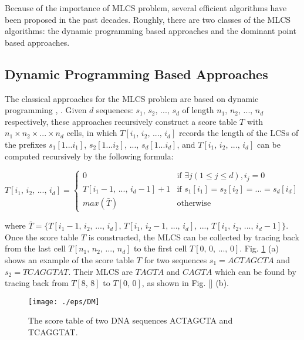 \documentclass{article}
\begin{document}
Because of the importance of MLCS problem, several efficient
algorithms have been proposed in the past decades. Roughly, there are
two classes of the MLCS algorithms: the dynamic programming based
approaches and the dominant point based approaches.

\subsection{Dynamic Programming Based Approaches}
\label{sec:Dynamic Programming}

The classical approaches for the MLCS problem are based on dynamic
programming \cite{Smith1981}, \cite{Sankoff1972}. Given $d$ sequences:
$s_1,\, s_2,\,...,\, s_d$ of length $n_1,\, n_2,\, ...,\, n_d$
respectively, these approaches recursively construct a score table $T$
with $n_1 \times n_2 \times ... \times n_d$ cells, in which
$T[i_1,\, i_2,\, ...,\, i_d]$ records the length of the LCSs of the
prefixes $s_1[1...i_1]$, $s_2[1...i_2]$, ..., $s_d[1...i_d]$, and
$T[i_1,\, i_2,\, ...,\, i_d]$ can be computed recursively by the
following formula:

\begin{equation*}
  T[i_1,\, i_2,\, ...,\, i_d] = 
  \begin{cases}
    0 & \text{if $\exists j(1 \leq j \leq d), i_j = 0$}\\
    T[i_1-1,\, ...,\, i_d-1] + 1  & \text{if $s_1[i_1] = s_2[i_2] =
      ... = s_d[i_d]$}\\
    max(\bar{T}) & \text{otherwise}
  \end{cases}
\end{equation*}

where $\bar{T} = \{T[i_1-1,\, i_2,\, ...,\, i_d],\, T[i_1,\, i_2-1,\,
...,\, i_d],\, ...,\, T[i_1,\, i_2,\, ...,\, i_d-1]\}$. Once the score
table $T$ is constructed, the MLCS can be collected by tracing back
from the last cell $T[n_1,\, n_2,\, ...,\, n_d]$ to the first cell
$T[0,\, 0,\, ...,\, 0]$. Fig. \ref{fig:DM} (a) shows an example of the
score table $T$ for two sequences $s_1 = ACTAGCTA$ and $s_2 =
TCAGGTAT$. Their MLCS are $TAGTA$ and $CAGTA$ which can be found by
tracing back from $T[8,\, 8]$ to $T[0,\, 0]$, as shown in Fig. [] (b).


\begin{figure}[htbp]
  \centering
  \texttt{[image: ./eps/DM]}
  \caption{The score table of two DNA sequences ACTAGCTA and TCAGGTAT.}
  \label{fig:DM}
\end{figure}
\end{document}
